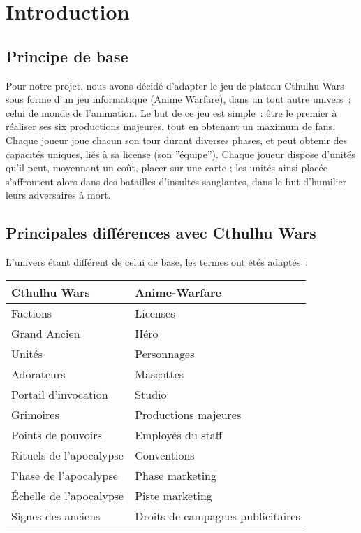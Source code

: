 \chapter{Introduction}

    \section{Principe de base}

        Pour notre projet, nous avons décidé d'adapter le jeu de plateau Cthulhu Wars
        sous forme d'un jeu informatique (Anime Warfare), dans un tout autre univers :
        celui de monde de l'animation. Le but de ce jeu est simple : être le premier à
        réaliser ses six productions majeures, tout en obtenant un maximum de fans.
        Chaque joueur joue chacun son tour durant diverses phases, et peut obtenir
        des capacités uniques, liés à sa license (son ''équipe'').
        \newline
        Chaque joueur dispose d'unités qu'il peut, moyennant un coût, placer sur une
        carte ; les unités ainsi placée s'affrontent alors dans des batailles d'insultes
        sanglantes, dans le but d'humilier leurs adversaires à mort.

    \section{Principales différences avec Cthulhu Wars}

        L'univers étant différent de celui de base, les termes ont étés adaptés :
        \begin{center}
            \begin{tabular}{|l|l|}
                \hline
                \textbf{Cthulhu Wars} & \textbf{Anime-Warfare} \\
                \hline
                \hline
                Factions & Licenses \\
                \hline
                Grand Ancien & Héro \\
                \hline
                Unités & Personnages \\
                \hline
                Adorateurs & Mascottes \\
                \hline
                Portail d'invocation & Studio \\
                \hline
                Grimoires & Productions majeures \\
                \hline
                Points de pouvoirs & Employés du staff \\
                \hline
                Rituels de l'apocalypse & Conventions \\
                \hline
                Phase de l'apocalypse & Phase marketing \\
                \hline
                Échelle de l'apocalypse & Piste marketing \\
                \hline
                Signes des anciens & Droits de campagnes publicitaires \\
                \hline
            \end{tabular}
        \end{center}

